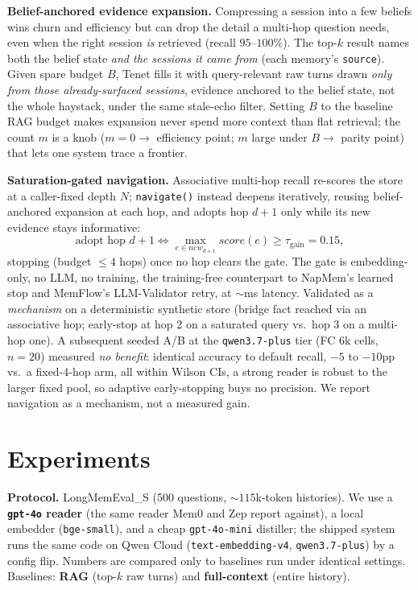 \documentclass[11pt]{article}
\begin{document}
\textbf{Belief-anchored evidence expansion.} Compressing a session into a few beliefs wins
churn and efficiency but can drop the detail a multi-hop question needs, even when the right
session \emph{is} retrieved (recall $95$--$100\%$). The top-$k$ result names both the belief
state \emph{and the sessions it came from} (each memory's \texttt{source}). Given spare
budget $B$, Tenet fills it with query-relevant raw turns drawn \emph{only from those
already-surfaced sessions}, evidence anchored to the belief state, not the whole
haystack, under the same stale-echo filter. Setting $B$ to the baseline RAG budget makes
expansion never spend more context than flat retrieval; the count $m$ is a knob ($m{=}0\to$
efficiency point; $m$ large under $B\to$ parity point) that lets one system trace a frontier.

\textbf{Saturation-gated navigation.}\label{sec:navigate} Associative multi-hop recall
re-scores the store at a caller-fixed depth $N$; \texttt{navigate()} instead deepens
iteratively, reusing belief-anchored expansion at each hop, and adopts hop $d{+}1$ only
while its new evidence stays informative:
\[
\text{adopt hop } d{+}1 \iff \max_{e\in\textit{new}_{d+1}}\textit{score}(e) \ge
\tau_{\text{gain}} = 0.15,
\]
stopping (budget $\le4$ hops) once no hop clears the gate. The gate is
embedding-only, no LLM, no training, the training-free counterpart to NapMem's
learned stop and MemFlow's LLM-Validator retry, at $\sim$ms latency. Validated as a
\emph{mechanism} on a deterministic synthetic store (bridge fact reached via an
associative hop; early-stop at hop 2 on a saturated query vs.\ hop 3 on a multi-hop
one). A subsequent seeded A/B at the \texttt{qwen3.7-plus} tier (FC 6k cells,
$n{=}20$) measured \emph{no benefit}: identical accuracy to default recall, $-5$
to $-10$pp vs.\ a fixed-4-hop arm, all within Wilson CIs, a strong reader is
robust to the larger fixed pool, so adaptive early-stopping buys no precision.
We report navigation as a mechanism, not a measured gain.

\section{Experiments}
\textbf{Protocol.} LongMemEval\_S (500 questions, ${\sim}115$k-token histories).
We use a \textbf{\texttt{gpt-4o} reader} (the same reader Mem0 and Zep report against), a local embedder (\texttt{bge-small}), and a cheap \texttt{gpt-4o-mini} distiller; the shipped system runs the same code on Qwen Cloud (\texttt{text-embedding-v4}, \texttt{qwen3.7-plus}) by a config flip. Numbers are compared only to baselines run under identical settings.
Baselines: \textbf{RAG} (top-$k$ raw turns) and \textbf{full-context} (entire history).
\end{document}

